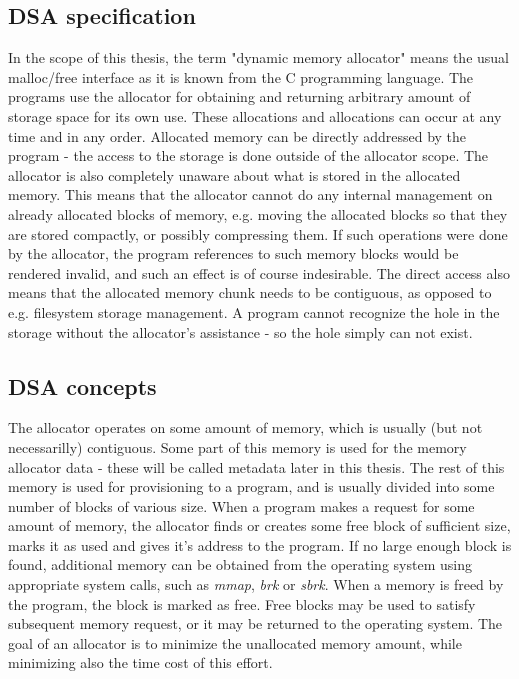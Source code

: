 \subsection{DSA specification}

In the scope of this thesis, the term "dynamic memory allocator" means the usual malloc/free interface as it is known from the C programming language. The programs use the allocator for obtaining and returning arbitrary amount of storage space for its own use. These allocations and allocations can occur at any time and in any order. Allocated memory can be directly addressed by the program - the access to the storage is done outside of the allocator scope. The allocator is also completely unaware about what is stored in the allocated memory. This means that the allocator cannot do any internal management on already allocated blocks of memory, e.g. moving the allocated blocks so that they are stored compactly, or possibly compressing them. If such operations were done by the allocator, the program references to such memory blocks would be rendered invalid, and such an effect is of course indesirable. The direct access also means that the allocated memory chunk needs to be contiguous, as opposed to e.g. filesystem storage management. A program cannot recognize the hole in the storage without the allocator's assistance - so the hole simply can not exist.

\subsection{DSA concepts}

The allocator operates on some amount of memory, which is usually (but not necessarilly) contiguous. Some part of this memory is used for the memory allocator data - these will be called metadata later in this thesis. The rest of this memory is used for provisioning to a program, and is usually divided into some number of blocks of various size. When a program makes a request for some amount of memory, the allocator finds or creates some free block of sufficient size, marks it as used and gives it's address to the program. If no large enough block is found, additional memory can be obtained from the operating system using appropriate system calls, such as {\em mmap}, {\em brk} or {\em sbrk}.\cite{sbrk-manpage, mmap-manpage} When a memory is freed by the program, the block is marked as free. Free blocks may be used to satisfy subsequent memory request, or it may be returned to the operating system. The goal of an allocator is to minimize the unallocated memory amount, while minimizing also the time cost of this effort.

